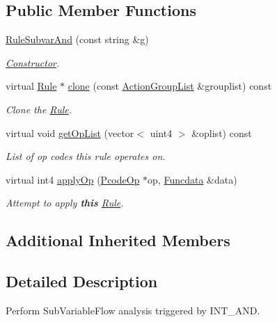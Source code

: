 \subsection*{Public Member Functions}
\begin{DoxyCompactItemize}
\item 
\mbox{\hyperlink{class_rule_subvar_and_a3cf5454eb07e66a704d9939883213dc8}{Rule\+Subvar\+And}} (const string \&g)
\begin{DoxyCompactList}\small\item\em \mbox{\hyperlink{class_constructor}{Constructor}}. \end{DoxyCompactList}\item 
virtual \mbox{\hyperlink{class_rule}{Rule}} $\ast$ \mbox{\hyperlink{class_rule_subvar_and_a342d056bd7dddb26c80742c518f74ea9}{clone}} (const \mbox{\hyperlink{class_action_group_list}{Action\+Group\+List}} \&grouplist) const
\begin{DoxyCompactList}\small\item\em Clone the \mbox{\hyperlink{class_rule}{Rule}}. \end{DoxyCompactList}\item 
virtual void \mbox{\hyperlink{class_rule_subvar_and_aba94563586cb1a9de571f1cd6fe737db}{get\+Op\+List}} (vector$<$ uint4 $>$ \&oplist) const
\begin{DoxyCompactList}\small\item\em List of op codes this rule operates on. \end{DoxyCompactList}\item 
virtual int4 \mbox{\hyperlink{class_rule_subvar_and_a8537105bf8b9f97d9d312e84b7f2b39b}{apply\+Op}} (\mbox{\hyperlink{class_pcode_op}{Pcode\+Op}} $\ast$op, \mbox{\hyperlink{class_funcdata}{Funcdata}} \&data)
\begin{DoxyCompactList}\small\item\em Attempt to apply {\bfseries{this}} \mbox{\hyperlink{class_rule}{Rule}}. \end{DoxyCompactList}\end{DoxyCompactItemize}
\subsection*{Additional Inherited Members}


\subsection{Detailed Description}
Perform Sub\+Variable\+Flow analysis triggered by I\+N\+T\+\_\+\+A\+ND. 

